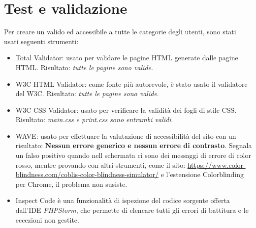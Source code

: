 \documentclass[1_relazione.tex]{subfiles}
\begin{document}
    \section{Test e validazione}\label{sec:test-e-validazione}
    Per creare un valido ed accessibile a tutte le categorie degli utenti, sono stati usati seguenti strumenti:
    \begin{itemize}
        \item{Total Validator}: usato per validare le pagine HTML generate dalle pagine HTML. Risultato: \textit{tutte le pagine sono valide}.
        \item{W3C HTML Validator}: come fonte pi\`{u} autorevole, \`{e} stato usato il validatore del W3C. Risultato: \textit{tutte le pagine sono valide}.
        \item{W3C CSS Validator}: usato per verificare la validit\`{a} dei fogli di stile CSS. Risultato: \textit{main.css e print.css sono entrambi validi}.
        \item{WAVE}: usato per effettuare la valutazione di accessibilit\`{a} del sito con un risultato: \textbf{Nessun errore generico e nessun errore di contrasto}. Segnala un falso positivo quando nell schermata ci sono dei messaggi di errore di color rosso, mentre provando con altri strumenti, come il sito: \url{https://www.color-blindness.com/coblis-color-blindness-simulator/} e l'estensione Colorblinding per Chrome, il problema non susiste. 
        \item{Inspect Code} \`{e} una funzionalit\`{a} di ispezione del codice sorgente offerta dall'IDE \textit{PHPStorm}, che permette di elencare tutti gli errori di battitura e le eccezioni non gestite.
    \end{itemize}
\end{document}
